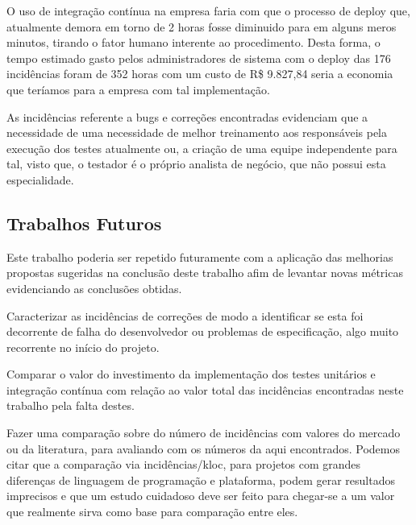 \documentclass[11pt, a4paper]{article}
\begin{document}
O uso de integração contínua na empresa faria com que o processo de deploy que, atualmente demora em torno de 2 horas fosse diminuido para em alguns meros minutos, tirando o fator humano interente ao procedimento. Desta forma, o tempo estimado gasto pelos administradores de sistema com o deploy das 176 incidências foram de 352 horas com um custo de R\$ 9.827,84 seria a economia que teríamos para a empresa com tal implementação.

As incidências referente a bugs e correções encontradas evidenciam que a necessidade de uma necessidade de melhor treinamento aos responsáveis pela execução dos testes atualmente ou, a criação de uma equipe independente para tal, visto que, o testador é o próprio analista de negócio, que não possui esta especialidade.

\subsection{Trabalhos Futuros}
Este trabalho poderia ser repetido futuramente com a aplicação das melhorias propostas sugeridas na conclusão deste trabalho afim de levantar novas métricas evidenciando as conclusões obtidas.

Caracterizar as incidências de correções de modo a identificar se esta foi decorrente de falha do desenvolvedor ou problemas de especificação, algo muito recorrente no início do projeto.

Comparar o valor do investimento da implementação dos testes unitários e integração contínua com relação ao valor total das incidências encontradas neste trabalho pela falta destes.\cite{defect-origin-removal}

Fazer uma comparação sobre do número de incidências com valores do mercado ou da literatura, para avaliando com os números da aqui encontrados. Podemos citar que a comparação via incidências/kloc, para projetos com grandes diferenças de linguagem de programação e plataforma, podem gerar resultados imprecisos \cite{loc-metric} \cite{bugs-loc} e que um estudo cuidadoso deve ser feito para chegar-se a um valor que realmente sirva como base para comparação entre eles.


\end{document}
